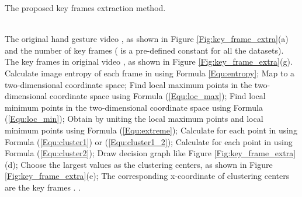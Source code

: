 \documentclass[5p]{elsarticle}
\begin{document}
\begin{algorithm}[!t] \small
	\caption{The proposed key frames extraction method.}
	\label{Alg:key_frame_framwork}
	\begin{algorithmic}[1] 
		\REQUIRE ~~\\
		The original hand gesture video , as shown in Figure \ref{Fig:key_frame_extra}(a) and the number of key frames  ( is a pre-defined constant for all the datasets).
		\ENSURE ~~\\ 
		The key frames  in original video , as shown in Figure \ref{Fig:key_frame_extra}(g).
		\STATE Calculate image entropy  of each frame in  using Formula \ref{Equ:entropy};
		\STATE Map  to a two-dimensional coordinate space;
		\STATE Find local maximum points  in the two-dimensional coordinate space using Formula (\ref{Equ:loc_max});
		\STATE Find local minimum points  in the two-dimensional coordinate space using Formula (\ref{Equ:loc_min});
		\STATE Obtain  by uniting the local maximum points  and local minimum points  using Formula (\ref{Equ:extreme});
		\STATE Calculate  for each point in  using Formula (\ref{Equ:cluster1}) or (\ref{Equ:cluster1_2});
		\STATE Calculate  for each point in  using Formula (\ref{Equ:cluster2});
		\STATE Draw decision graph like Figure \ref{Fig:key_frame_extra}(d);
		\STATE Choose the  largest  values as the clustering centers, as shown in Figure \ref{Fig:key_frame_extra}(e);
		\STATE The corresponding x-coordinate of  clustering centers are the key frames .
		\RETURN .
	\end{algorithmic}
\end{algorithm}
\end{document}
